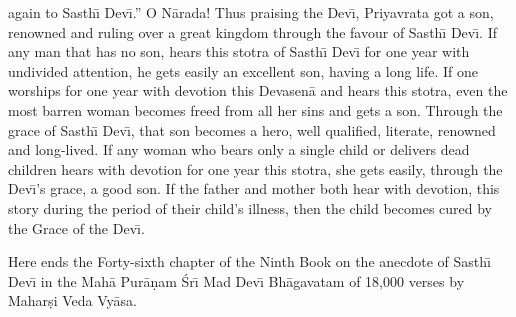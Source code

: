 again to Sasth\={\i} Dev\={\i}.'' O N\=arada! Thus praising the Dev\={\i}, Priyavrata got a son, renowned and ruling over a great kingdom through the favour of Sasth\={\i} Dev\={\i}. If any man that has no son, hears this stotra of Sasth\={\i} Dev\={\i} for one year with undivided attention, he gets easily an excellent son, having a long life. If one worships for one year with devotion this Devasen\=a and hears this stotra, even the most barren woman becomes freed from all her sins and gets a son. Through the grace of Sasth\={\i} Dev\={\i}, that son becomes a hero, well qualified, literate, renowned and long-lived. If any woman who bears only a single child or delivers dead children hears with devotion for one year this stotra, she gets easily, through the Dev\={\i}'s grace, a good son. If the father and mother both hear with devotion, this story during the period of their child's illness, then the child becomes cured by the Grace of the Dev\={\i}.

Here ends the Forty-sixth chapter of the Ninth Book on the anecdote of Sasth\={\i} Dev\={\i} in the Mah\=a Pur\=a\d{n}am \'Sr\={\i} Mad Dev\={\i} Bh\=agavatam of 18,000 verses by Mahar\d{s}i Veda Vy\=asa.



